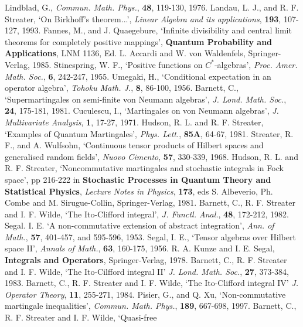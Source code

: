 \begin{thebibliography}{99}
 Lindblad, G., {\em Commun. Math. Phys.}, {\bf 48},
119-130, 1976.
 Landau, L. J., and R. F. Streater, `On Birkhoff's
theorem...', {\em Linear Algebra and its applications}, {\bf 193},
107-127, 1993.
 Fannes, M., and J. Quaegebure, `Infinite divisibility
and central limit theorems for completely positive mappings', {\bf Quantum
Probability and Applications}, LNM 1136, Ed. L. Accardi and W. von
Waldenfels, Springer-Verlag, 1985.
 Stinespring, W. F., `Positive functions on
$C^*$-algebras', {\em Proc. Amer. Math. Soc.}, {\bf 6}, 242-247, 1955.
 Umegaki, H., `Conditional expectation in an operator
algebra', {\em Tohoku Math. J.}, {\bf 8}, 86-100, 1956.
 Barnett, C., `Supermartingales on semi-finite von
Neumann algebras', {\em J. Lond. Math. Soc.}, {\bf 24}, 175-181, 1981.
 Cuculescu, I., `Martingales on von Neumann algebras',
{\em J. Multivariate Analysis}, {\bf 1}, 17-27, 1971.
 Hudson, R. L. and R. F. Streater, `Examples of
Quantum Martingales', {\em Phys. Lett.}, {\bf 85A}, 64-67, 1981.
 Streater, R. F., and A. Wulfsohn, `Continuous tensor
products of Hilbert spaces and generalised random fields', {\em Nuovo Cimento},
{\bf 57}, 330-339, 1968.
 Hudson, R. L. and R. F. Streater, `Noncommutative
martingales and
stochastic integrals in Fock space', pp 216-222 in {\bf Stochastic Processes
in Quantum Theory and Statistical Physics}, {\em Lecture Notes in Physics},
{\bf 173}, eds S. Albeverio, Ph. Combe and M. Sirugue-Collin,
Springer-Verlag, 1981.
 Barnett, C., R. F. Streater and I. F. Wilde, `The
Ito-Clifford integral', {\em J. Functl. Anal.}, {\bf 48}, 172-212, 1982.
 Segal. I. E. `A non-commutative extension of abstract
integration', {\em Ann. of Math.}, {\bf 57}, 401-457, and 595-596, 1953.
 Segal, I. E., `Tensor algebras over Hilbert space II',
{\em Annals of Math.}, {\bf 63}, 160-175, 1956.
 R. A. Kunze and I. E. Segal, {\bf Integrals and
Operators}, Springer-Verlag, 1978.
 Barnett, C., R. F. Streater and I. F. Wilde,
`The Ito-Cilfford integral II' {\em J. Lond. Math. Soc.}, {\bf 27},
373-384, 1983.
 Barnett, C., R. F. Streater and I. F. Wilde, `The
Ito-Clifford integral IV' {\em J. Operator Theory}, {\bf 11}, 255-271, 1984.
 Pisier, G., and Q. Xu, `Non-commutative martingale
inequalities', {\em Commun. Math. Phys.}, {\bf 189}, 667-698, 1997.
 Barnett, C., R. F. Streater and I. F. Wilde, `Quasi-free

\end{thebibliography}
